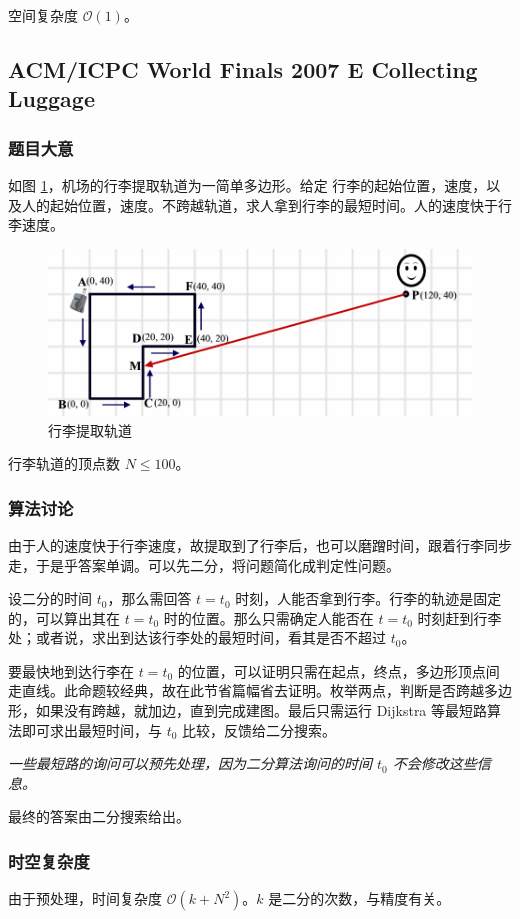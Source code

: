 				空间复杂度 $\mathcal{O}\left(1\right)$。
		\newpage

	
		\subsection{ACM/ICPC World Finals 2007 E Collecting Luggage}
			\subsubsection{题目大意}
			如图 \ref{2007e}，机场的行李提取轨道为一简单多边形。给定
			行李的起始位置，速度，以及人的起始位置，速度。不跨越轨道，求人拿到行李的最短时间。人的速度快于行李速度。
				\begin{figure}[htb]
					\centering
					\includegraphics[width=0.7 \textwidth]{2007e.png}
					\caption{行李提取轨道} \label{2007e}
				\end{figure}
			
			行李轨道的顶点数 $N \le 100 $。
		\subsubsection{算法讨论}	
			由于人的速度快于行李速度，故提取到了行李后，也可以磨蹭时间，跟着行李同步走，于是乎答案单调。可以先二分，将问题简化成判定性问题。
			
			设二分的时间 $t_0$，那么需回答 $t = t_0$ 时刻，人能否拿到行李。行李的轨迹是固定的，可以算出其在 $t = t_0$ 时的位置。那么只需确定人能否在  $t = t_0$  时刻赶到行李处；或者说，求出到达该行李处的最短时间，看其是否不超过 $t_0$。
			
			要最快地到达行李在 $t = t_0$ 的位置，可以证明只需在起点，终点，多边形顶点间走直线。此命题较经典，故在此节省篇幅省去证明。枚举两点，判断是否跨越多边形，如果没有跨越，就加边，直到完成建图。最后只需运行 Dijkstra 等最短路算法即可求出最短时间，与 $t_0$ 比较，反馈给二分搜索。
			
			\emph{一些最短路的询问可以预先处理，因为二分算法询问的时间 $t_0$ 不会修改这些信息。}
			
			最终的答案由二分搜索给出。
					
			\subsubsection{时空复杂度}
				由于预处理，时间复杂度 $\mathcal{O}\left(k + N^2\right)$。$k$ 是二分的次数，与精度有关。
					

